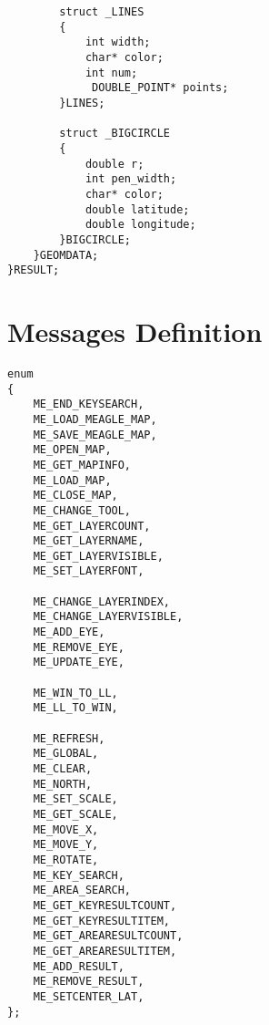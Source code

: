 \documentclass[a4paper]{article}
\begin{document}
\begin{appendix}
\begin{lstlisting}
        struct _LINES
        {
            int width;
            char* color;
            int num;
             DOUBLE_POINT* points;
        }LINES;

        struct _BIGCIRCLE
        {
            double r;
            int pen_width;
            char* color;
            double latitude;
            double longitude;
        }BIGCIRCLE;
    }GEOMDATA;
}RESULT;
\end{lstlisting}

\newpage

\section{Messages Definition}
\begin{verbatim}
enum
{
    ME_END_KEYSEARCH,
    ME_LOAD_MEAGLE_MAP,
    ME_SAVE_MEAGLE_MAP,
    ME_OPEN_MAP,
    ME_GET_MAPINFO,
    ME_LOAD_MAP,
    ME_CLOSE_MAP,
    ME_CHANGE_TOOL,
    ME_GET_LAYERCOUNT,
    ME_GET_LAYERNAME,
    ME_GET_LAYERVISIBLE,
    ME_SET_LAYERFONT,
    
    ME_CHANGE_LAYERINDEX,
    ME_CHANGE_LAYERVISIBLE,
    ME_ADD_EYE,
    ME_REMOVE_EYE,
    ME_UPDATE_EYE,

    ME_WIN_TO_LL,
    ME_LL_TO_WIN,

    ME_REFRESH,
    ME_GLOBAL,
    ME_CLEAR,
    ME_NORTH,
    ME_SET_SCALE,
    ME_GET_SCALE,
    ME_MOVE_X,
    ME_MOVE_Y,
    ME_ROTATE,
    ME_KEY_SEARCH,
    ME_AREA_SEARCH,
    ME_GET_KEYRESULTCOUNT,
    ME_GET_KEYRESULTITEM,
    ME_GET_AREARESULTCOUNT,
    ME_GET_AREARESULTITEM,
    ME_ADD_RESULT,
    ME_REMOVE_RESULT,
    ME_SETCENTER_LAT,
};
\end{verbatim}

\end{appendix}
\end{document}
